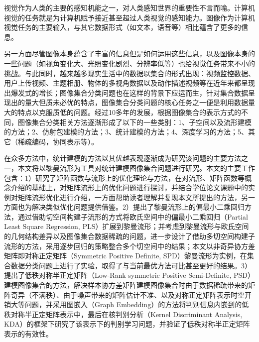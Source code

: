 \begin{cabstract}
视觉作为人类的主要的感知机能之一，对人类感知世界的重要性不言而喻。计算机视觉的任务就是为计算机赋予接近甚至超过人类视觉的感知能力。图像作为计算机视觉任务的主要输入，与其它数据形式（如文本，语音等）相比蕴含了更多的信息。

另一方面尽管图像本身蕴含了丰富的信息但是如何运用这些信息，以及图像本身的一些问题（如视角变化大、光照变化剧烈、分辨率低等）也给视觉任务带来不小的挑战。与此同时，越来越多现实生活中的数据以集合的形式出现：视频监控数据、用户上传视频、主题相册、物体的多视角数据以及动作描述视频等在近年来都呈现出爆发式的增长；图像集合分类问题也在这样的背景下应运而生，针对集合数据呈现出的量大但质未必优的特点，图像集合分类问题的核心任务之一便是利用数据量大的特点以克服质低的问题。经过10多年的发展，根据图像集合的表示方式的不同，图像集合分类相关方法逐渐形成了以下的一些类别：1、子空间以及流形建模的方法；2、仿射包建模的方法；3、统计建模的方法；4、深度学习的方法；5、其它（稀疏编码，协同表示等）。

在众多方法中，统计建模的方法以其优越表现逐渐成为研究该问题的主要方法之一，本文将以黎曼流形为工具对统计建模图像集合问题进行研究。本文的主要工作包含：1）研究了矩阵函数与流形上的优化理论与方法，在对流形、矩阵函数等概念介绍的基础上，对矩阵流形上的优化问题进行探讨，并结合学位论文课题中的实例对矩阵流形优化进行介绍，一方面帮助读者理解并复现本文所提出的方法，另一方面也为解决类似优化问题提供借鉴。2）提出了黎曼流形上的偏最小二乘回归方法，通过借助切空间构建子流形的方式将欧氏空间中的偏最小二乘回归（Partial Least Square Regression, PLS）扩展到黎曼流形；并考虑到黎曼流形与欧氏空间的几何结构差异以及图像集合数据稀疏的问题，进一步设计了借助多切空间构建子流形的方法，采用逐步回归的策略整合多个切空间中的结果；本文以非奇异协方差矩阵即对称正定矩阵（Symmetric Positive Definite, SPD）黎曼流形为实例，在集合数据分类问题上进行了实验，取得了与当前最优方法可比甚至更好的结果。3）提出了低秩对称半正定矩阵（Low-Rank symmetric Positive Semi-Definite, PSD）建模图像集合的方法，解决样本协方差矩阵建模图像集合时由于数据稀疏带来的矩阵奇异（不满秩）、由于噪声带来的矩阵估计不准、以及对称正定矩阵表示时空开销大等问题，并采用图嵌入（Graph Embedding）的方法将判别信息内嵌到的低秩对称半正定矩阵表示中，最后在核判别分析（Kernel Discriminant Analysis, KDA）的框架下研究了该表示下的判别学习问题，并验证了低秩对称半正定矩阵表示的有效性。


\end{cabstract}
